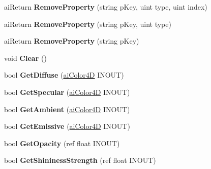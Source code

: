\begin{DoxyCompactItemize}
\item 
\hypertarget{classai_material_ada58a53a8ee07efd5e9e3019911b6fa2}{ai\+Return {\bfseries Remove\+Property} (string p\+Key, uint type, uint index)}\label{classai_material_ada58a53a8ee07efd5e9e3019911b6fa2}

\item 
\hypertarget{classai_material_a8c42741b9db6a3d20a4f7186a80aec41}{ai\+Return {\bfseries Remove\+Property} (string p\+Key, uint type)}\label{classai_material_a8c42741b9db6a3d20a4f7186a80aec41}

\item 
\hypertarget{classai_material_ab7d3ebd0ff38adb8c8a7d958bf2dfa42}{ai\+Return {\bfseries Remove\+Property} (string p\+Key)}\label{classai_material_ab7d3ebd0ff38adb8c8a7d958bf2dfa42}

\item 
\hypertarget{classai_material_a9e66c8d6da65d5ef14b06876d93ba8ec}{void {\bfseries Clear} ()}\label{classai_material_a9e66c8d6da65d5ef14b06876d93ba8ec}

\item 
\hypertarget{classai_material_af3ad7a197d78130054b20be6f04e59ce}{bool {\bfseries Get\+Diffuse} (\hyperlink{structai_color4_d}{ai\+Color4\+D} I\+N\+O\+U\+T)}\label{classai_material_af3ad7a197d78130054b20be6f04e59ce}

\item 
\hypertarget{classai_material_acc34a666d70aba78c9d6fbb1e6315d97}{bool {\bfseries Get\+Specular} (\hyperlink{structai_color4_d}{ai\+Color4\+D} I\+N\+O\+U\+T)}\label{classai_material_acc34a666d70aba78c9d6fbb1e6315d97}

\item 
\hypertarget{classai_material_aaacde6447e54f4c08a9276e2b235a1f3}{bool {\bfseries Get\+Ambient} (\hyperlink{structai_color4_d}{ai\+Color4\+D} I\+N\+O\+U\+T)}\label{classai_material_aaacde6447e54f4c08a9276e2b235a1f3}

\item 
\hypertarget{classai_material_a3ae17fd021553a0067226776f7480393}{bool {\bfseries Get\+Emissive} (\hyperlink{structai_color4_d}{ai\+Color4\+D} I\+N\+O\+U\+T)}\label{classai_material_a3ae17fd021553a0067226776f7480393}

\item 
\hypertarget{classai_material_ab0861faa4a55250744c2227d15aab09e}{bool {\bfseries Get\+Opacity} (ref float I\+N\+O\+U\+T)}\label{classai_material_ab0861faa4a55250744c2227d15aab09e}

\item 
\hypertarget{classai_material_a72dc5ed469c513918c4bcfb37c09ab2b}{bool {\bfseries Get\+Shininess\+Strength} (ref float I\+N\+O\+U\+T)}\label{classai_material_a72dc5ed469c513918c4bcfb37c09ab2b}


\end{DoxyCompactItemize}
